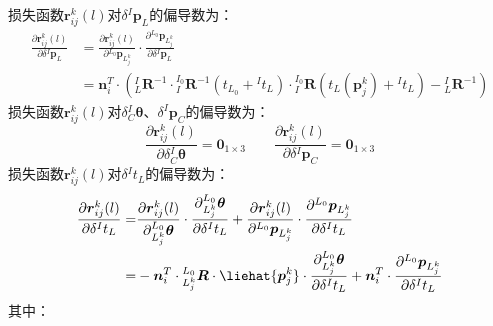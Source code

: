 损失函数$\boldsymbol{r}_{ij}^k(l)$对$\delta{^{I}\boldsymbol{p}_L}$的偏导数为：
\begin{equation}
  \label{equ:jacobian_pli}
  \begin{aligned}
    \frac{\partial \boldsymbol{r}_{ij}^k(l)}{\partial \delta {^{I}\boldsymbol{p}_L}} & =
    \frac{\partial \boldsymbol{r}_{ij}^k(l)}{\partial {^{L_0}\boldsymbol{p}_{L_j^k}}}\cdot
    \frac{\partial {^{L_0}\boldsymbol{p}_{L_j^k}}}{\partial \delta {^{I}\boldsymbol{p}_L}} \\&=
    \boldsymbol{n}_i^T\cdot
    \left(
    {{^{I}_{L}}\boldsymbol{R}^{-1}}\cdot{{^{I_0}_{I}}\boldsymbol{R}^{-1}\left( t_{L_0}+{^{I}t_L}\right) }\cdot{{^{I_0}_{I}}\boldsymbol{R}\left( t_{L}(\boldsymbol{p}_j^k)+{^{I}t_L}\right) }-{{^{I}_{L}}\boldsymbol{R}^{-1}}
    \right)
  \end{aligned}
\end{equation}
损失函数$\boldsymbol{r}_{ij}^k(l)$对$\delta{^{I}_{C}\boldsymbol{\theta}}$、${\delta^{I}\boldsymbol{p}_C}$的偏导数为：
\begin{equation}
  \frac{\partial \boldsymbol{r}_{ij}^k(l)}{\partial \delta {^{I}_{C}\boldsymbol{\theta}}}=\boldsymbol{0}_{1\times 3}
  \quad\quad
  \frac{\partial \boldsymbol{r}_{ij}^k(l)}{\partial \delta {^{I}\boldsymbol{p}_C}}=\boldsymbol{0}_{1\times 3}
\end{equation}
损失函数$\boldsymbol{r}_{ij}^k(l)$对$\delta{^{I}t_{L}}$的偏导数为：
\begin{equation}
  \begin{aligned}
    \label{equ:jacobian_tli}
    \frac{\partial \boldsymbol{r}_{ij}^k(l)}{\partial \delta {^{I}t_{L}}}= &
    \frac{\partial \boldsymbol{r}_{ij}^k(l)}{\partial  {^{L_0}_{L_j^k}\boldsymbol{\theta}}}\cdot
    \frac{\partial {^{L_0}_{L_j^k}\boldsymbol{\theta}}}{\partial \delta{^{I}t_{L}}}
    +
    \frac{\partial \boldsymbol{r}_{ij}^k(l)}{\partial {^{L_0}\boldsymbol{p}_{L_j^k}}}\cdot
    \frac{\partial {^{L_0}\boldsymbol{p}_{L_j^k}}}{\partial \delta {^{I}t_{L}}}
    \\
    =                                                                      & -\boldsymbol{n}_i^T\cdot{^{L_0}_{L_j^k}\boldsymbol{R}\cdot\liehat{\boldsymbol{p}_j^k}}\cdot
    \frac{\partial {^{L_0}_{L_j^k}\boldsymbol{\theta}}}{\partial \delta{^{I}t_{L}}}
    +
    \boldsymbol{n}_i^T\cdot\frac{\partial {^{L_0}\boldsymbol{p}_{L_j^k}}}{\partial \delta {^{I}t_{L}}}
  \end{aligned}
\end{equation}
其中：
